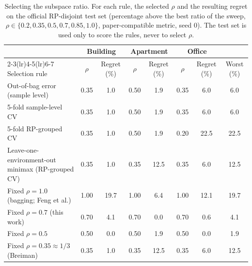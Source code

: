 \begin{table}[!t]
\centering
\caption{Selecting the subspace ratio. For each rule, the selected $\rho$ and the resulting regret on the official RP-disjoint test set (percentage above the best ratio of the sweep, $\rho\in\{0.2,0.35,0.5,0.7,0.85,1.0\}$, paper-compatible metric, seed 0). The test set is used only to score the rules, never to select $\rho$.}
\label{tab:ratio_selection}
\footnotesize
\setlength{\tabcolsep}{4pt}
\begin{tabular}{lccccccc}
\toprule
 & \multicolumn{2}{c}{Building} & \multicolumn{2}{c}{Apartment} & \multicolumn{2}{c}{Office} & \\
\cmidrule(lr){2-3}\cmidrule(lr){4-5}\cmidrule(lr){6-7}
Selection rule & $\rho$ & Regret (\%) & $\rho$ & Regret (\%) & $\rho$ & Regret (\%) & Worst (\%) \\
\midrule
Out-of-bag error (sample level) & 0.35 & 1.0 & 0.50 & 1.9 & 0.35 & 6.0 & 6.0 \\
5-fold sample-level CV & 0.35 & 1.0 & 0.50 & 1.9 & 0.35 & 6.0 & 6.0 \\
5-fold RP-grouped CV & 0.35 & 1.0 & 0.50 & 1.9 & 0.20 & 22.5 & 22.5 \\
Leave-one-environment-out minimax (RP-grouped CV) & 0.35 & 1.0 & 0.35 & 12.5 & 0.35 & 6.0 & 12.5 \\
Fixed $\rho=1.0$ (bagging; Feng et al.) & 1.00 & 19.7 & 1.00 & 6.4 & 1.00 & 12.1 & 19.7 \\
Fixed $\rho=0.7$ (this work) & 0.70 & 4.1 & 0.70 & 0.0 & 0.70 & 0.6 & 4.1 \\
Fixed $\rho=0.5$ & 0.50 & 0.0 & 0.50 & 1.9 & 0.50 & 0.0 & 1.9 \\
Fixed $\rho=0.35\approx1/3$ (Breiman) & 0.35 & 1.0 & 0.35 & 12.5 & 0.35 & 6.0 & 12.5 \\
\bottomrule
\end{tabular}
\end{table}
